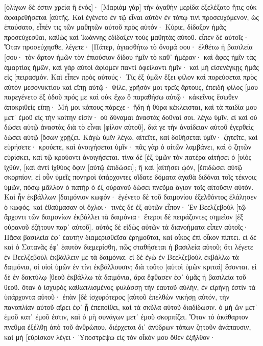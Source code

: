 [ὀλίγων δέ ἐστιν χρεία ἢ ἑνός]· [Μαριὰμ γὰρ] τὴν ἀγαθὴν μερίδα ἐξελέξατο ἥτις οὐκ ἀφαιρεθήσεται [αὐτῆς. 
Καὶ ἐγένετο ἐν τῷ εἶναι αὐτὸν ἐν τόπῳ τινὶ προσευχόμενον, ὡς ἐπαύσατο, εἶπέν τις τῶν μαθητῶν αὐτοῦ πρὸς αὐτόν· Κύριε, δίδαξον ἡμᾶς προσεύχεσθαι, καθὼς καὶ Ἰωάννης ἐδίδαξεν τοὺς μαθητὰς αὐτοῦ. 
εἶπεν δὲ αὐτοῖς· Ὅταν προσεύχησθε, λέγετε· [Πάτερ, ἁγιασθήτω τὸ ὄνομά σου· ἐλθέτω ἡ βασιλεία [σου· 
τὸν ἄρτον ἡμῶν τὸν ἐπιούσιον δίδου ἡμῖν τὸ καθ᾽ ἡμέραν· 
καὶ ἄφες ἡμῖν τὰς ἁμαρτίας ἡμῶν, καὶ γὰρ αὐτοὶ ἀφίομεν παντὶ ὀφείλοντι ἡμῖν· καὶ μὴ εἰσενέγκῃς ἡμᾶς εἰς [πειρασμόν. 
Καὶ εἶπεν πρὸς αὐτούς· Τίς ἐξ ὑμῶν ἕξει φίλον καὶ πορεύσεται πρὸς αὐτὸν μεσονυκτίου καὶ εἴπῃ αὐτῷ· Φίλε, χρῆσόν μοι τρεῖς ἄρτους, 
ἐπειδὴ φίλος [μου παρεγένετο ἐξ ὁδοῦ πρός με καὶ οὐκ ἔχω ὃ παραθήσω αὐτῷ· 
κἀκεῖνος ἔσωθεν ἀποκριθεὶς εἴπῃ· Μή μοι κόπους πάρεχε· ἤδη ἡ θύρα κέκλεισται, καὶ τὰ παιδία μου μετ᾽ ἐμοῦ εἰς τὴν κοίτην εἰσίν· οὐ δύναμαι ἀναστὰς δοῦναί σοι. 
λέγω ὑμῖν, εἰ καὶ οὐ δώσει αὐτῷ ἀναστὰς διὰ τὸ εἶναι [φίλον αὐτοῦ], διά γε τὴν ἀναίδειαν αὐτοῦ ἐγερθεὶς δώσει αὐτῷ [ὅσων χρῄζει. 
Κἀγὼ ὑμῖν λέγω, αἰτεῖτε, καὶ δοθήσεται ὑμῖν· ζητεῖτε, καὶ εὑρήσετε· κρούετε, καὶ ἀνοιγήσεται ὑμῖν· 
πᾶς γὰρ ὁ αἰτῶν λαμβάνει, καὶ ὁ ζητῶν εὑρίσκει, καὶ τῷ κρούοντι ἀνοιγήσεται. 
τίνα δὲ [ἐξ ὑμῶν τὸν πατέρα αἰτήσει ὁ [υἱὸς ἰχθύν, [καὶ ἀντὶ ἰχθύος ὄφιν [αὐτῷ ἐπιδώσει]; 
ἢ καὶ [αἰτήσει ᾠόν, [ἐπιδώσει αὐτῷ σκορπίον; 
εἰ οὖν ὑμεῖς πονηροὶ ὑπάρχοντες οἴδατε δόματα ἀγαθὰ διδόναι τοῖς τέκνοις ὑμῶν, πόσῳ μᾶλλον ὁ πατὴρ ὁ ἐξ οὐρανοῦ δώσει πνεῦμα ἅγιον τοῖς αἰτοῦσιν αὐτόν. 
Καὶ ἦν ἐκβάλλων [δαιμόνιον κωφόν· ἐγένετο δὲ τοῦ δαιμονίου ἐξελθόντος ἐλάλησεν ὁ κωφός. καὶ ἐθαύμασαν οἱ ὄχλοι· 
τινὲς δὲ ἐξ αὐτῶν εἶπον· Ἐν Βεελζεβοὺλ [τῷ ἄρχοντι τῶν δαιμονίων ἐκβάλλει τὰ δαιμόνια· 
ἕτεροι δὲ πειράζοντες σημεῖον [ἐξ οὐρανοῦ ἐζήτουν παρ᾽ αὐτοῦ]. 
αὐτὸς δὲ εἰδὼς αὐτῶν τὰ διανοήματα εἶπεν αὐτοῖς· Πᾶσα βασιλεία ἐφ᾽ ἑαυτὴν διαμερισθεῖσα ἐρημοῦται, καὶ οἶκος ἐπὶ οἶκον πίπτει. 
εἰ δὲ καὶ ὁ Σατανᾶς ἐφ᾽ ἑαυτὸν διεμερίσθη, πῶς σταθήσεται ἡ βασιλεία αὐτοῦ; ὅτι λέγετε ἐν Βεελζεβοὺλ ἐκβάλλειν με τὰ δαιμόνια. 
εἰ δὲ ἐγὼ ἐν Βεελζεβοὺλ ἐκβάλλω τὰ δαιμόνια, οἱ υἱοὶ ὑμῶν ἐν τίνι ἐκβάλλουσιν; διὰ τοῦτο [αὐτοὶ ὑμῶν κριταὶ] ἔσονται. 
εἰ δὲ ἐν δακτύλῳ [θεοῦ ἐκβάλλω τὰ δαιμόνια, ἄρα ἔφθασεν ἐφ᾽ ὑμᾶς ἡ βασιλεία τοῦ θεοῦ. 
ὅταν ὁ ἰσχυρὸς καθωπλισμένος φυλάσσῃ τὴν ἑαυτοῦ αὐλήν, ἐν εἰρήνῃ ἐστὶν τὰ ὑπάρχοντα αὐτοῦ· 
ἐπὰν [δὲ ἰσχυρότερος [αὐτοῦ ἐπελθὼν νικήσῃ αὐτόν, τὴν πανοπλίαν αὐτοῦ αἴρει ἐφ᾽ ᾗ ἐπεποίθει, καὶ τὰ σκῦλα αὐτοῦ διαδίδωσιν. 
ὁ μὴ ὢν μετ᾽ ἐμοῦ κατ᾽ ἐμοῦ ἐστιν, καὶ ὁ μὴ συνάγων μετ᾽ ἐμοῦ σκορπίζει. 
Ὅταν τὸ ἀκάθαρτον πνεῦμα ἐξέλθῃ ἀπὸ τοῦ ἀνθρώπου, διέρχεται δι᾽ ἀνύδρων τόπων ζητοῦν ἀνάπαυσιν, καὶ μὴ [εὑρίσκον λέγει· Ὑποστρέψω εἰς τὸν οἶκόν μου ὅθεν ἐξῆλθον· 
